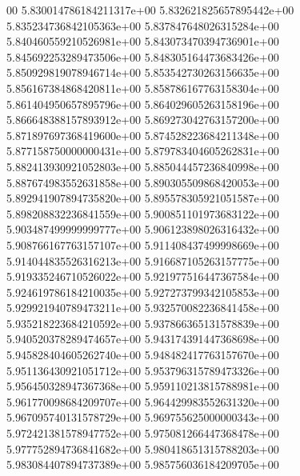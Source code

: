 00	5.830014786184211317e+00	5.832621825657895442e+00	5.835234736842105363e+00	5.837847648026315284e+00	5.840460559210526981e+00	5.843073470394736901e+00	5.845692253289473506e+00	5.848305164473683426e+00	5.850929819078946714e+00	5.853542730263156635e+00	5.856167384868420811e+00	5.858786167763158304e+00	5.861404950657895796e+00	5.864029605263158196e+00	5.866648388157893912e+00	5.869273042763157200e+00	5.871897697368419600e+00	5.874528223684211348e+00	5.877158750000000431e+00	5.879783404605262831e+00	5.882413930921052803e+00	5.885044457236840998e+00	5.887674983552631858e+00	5.890305509868420053e+00	5.892941907894735820e+00	5.895578305921051587e+00	5.898208832236841559e+00	5.900851101973683122e+00	5.903487499999999777e+00	5.906123898026316432e+00	5.908766167763157107e+00	5.911408437499998669e+00	5.914044835526316213e+00	5.916687105263157775e+00	5.919335246710526022e+00	5.921977516447367584e+00	5.924619786184210035e+00	5.927273799342105853e+00	5.929921940789473211e+00	5.932570082236841458e+00	5.935218223684210592e+00	5.937866365131578839e+00	5.940520378289474657e+00	5.943174391447368698e+00	5.945828404605262740e+00	5.948482417763157670e+00	5.951136430921051712e+00	5.953796315789473326e+00	5.956450328947367368e+00	5.959110213815788981e+00	5.961770098684209707e+00	5.964429983552631320e+00	5.967095740131578729e+00	5.969755625000000343e+00	5.972421381578947752e+00	5.975081266447368478e+00	5.977752894736841682e+00	5.980418651315788203e+00	5.983084407894737389e+00	5.985756036184209705e+00
